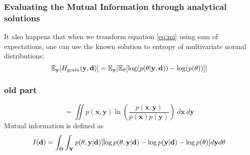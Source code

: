 \subsubsection{Evaluating the Mutual Information through analytical solutions}
It also happens that when we transform equation \ref{eq:mi} using sum of expectations, one can use the known solution to entropy of multivariate normal distributions:
\begin{equation} \mathbb{E}_{\mathbf{y}}[H_\textrm{grain}(\mathbf{y}, \mathbf{d})]  = \mathbb{E}_{\mathbf{y}}[\mathbb{E}_\theta [\log(p(\theta | \mathbf{y}, \mathbf{d})) - \log(p(\theta))]]\end{equation}

\subsubsection{old part}
\begin{equation}
= \iint p(\mathbf{x,y})\ln (\frac{p(\mathbf{x,y})}{p(\mathbf{x})p(\mathbf{y})}) \ d\mathbf{x}\ d\mathbf{y}
\end{equation}
Mutual information is defined as
$$I(\mathbf{d}) = \int_{\Theta}\int_{\mathbf{Y}}p(\mathbf{\theta}, \mathbf{y}|\mathbf{d})[\log p(\mathbf{\theta}, \mathbf{y}|\mathbf{d}) - \log p(\mathbf{y}|\mathbf{d}) - \log p(\mathbf{\theta})]d\mathbf{y}d\mathbf{\theta}$$

